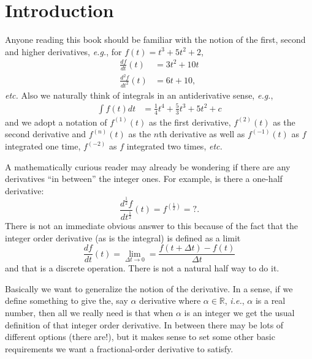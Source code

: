 \chapter{Introduction}

Anyone reading this book should be familiar with the notion of the first, second and higher derivatives, \textit{e.g.}, for $f(t) = t^3 + 5 t^2 + 2$, 
\begin{align}
  \frac{df}{dt}(t) &= 3 t^2 + 10 t \\
  \frac{d^2f}{dt^2}(t) &= 6t + 10, 
  \label{eq:derivs}
\end{align}
\textit{etc.} Also we naturally think of integrals in an antiderivative sense, \textit{e.g.},
\begin{align}
  \int f(t) dt &= \frac{1}{4} t^4 + \frac{5}{3} t^3 + 5 t^2 + c 
  \label{eq:integrals}
\end{align}
and we adopt a notation of $f^{(1)}(t)$ as the first derivative, $f^{(2)}(t)$ as the second derivative and $f^{(n)}(t)$ as the $n$th derivative as well as $f^{(-1)}(t)$ as $f$ integrated one time, $f^{(-2)}$ as $f$ integrated two times, \textit{etc.}

A mathematically curious reader may already be wondering if there are any derivatives ``in between'' the integer ones.
For example, is there a one-half derivative:
\begin{equation}
  \frac{d^\frac{1}{2} f}{d t^\frac{1}{2}}(t) = f^{\left(\frac{1}{2}\right)} = ?.
  \label{eq:halfderiv}
\end{equation}
There is not an immediate obvious answer to this because of the fact that the integer order derivative (as is the integral) is defined as a limit
\begin{equation}
  \frac{df}{dt}(t) = \lim_{\Delta t \rightarrow 0} = \frac{f\left(t + \Delta t \right) - f\left(t\right)}{\Delta t}
  \label{eq:limdef}
\end{equation}
and that is a discrete operation. There is not a natural half way to do it.

Basically we want to generalize the notion of the derivative. In a sense, if we define something to give the, say $\alpha$ derivative where $\alpha \in \mathbb R$, \textit{i.e.}, $\alpha$ is a real number, then all we really need is that when $\alpha$ is an integer we get the usual definition of that integer order derivative. In between there may be lots of different options (there are!), but it makes sense to set some other basic requirements we want a fractional-order derivative to satisfy.

